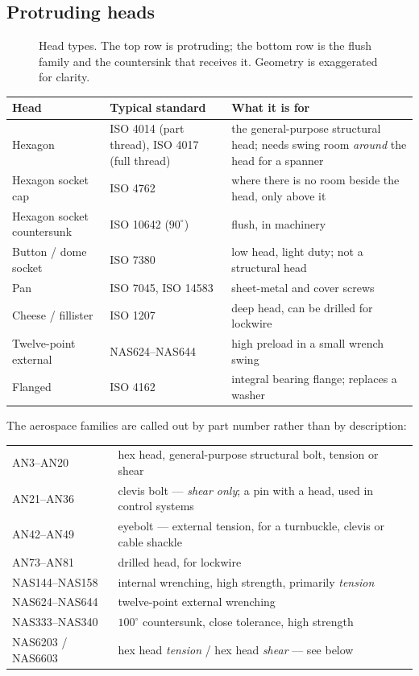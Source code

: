 \documentclass[11pt,a4paper]{article}
\begin{document}
\subsection{Protruding heads}

\begin{figure}[H]\centering
\resizebox{\textwidth}{!}{}
\caption{Head types. The top row is protruding; the bottom row is the flush family and the
countersink that receives it. Geometry is exaggerated for clarity.}
\label{fig:heads}
\end{figure}

\begin{center}\footnotesize
\begin{tabular}{@{}p{3.3cm}p{3.1cm}p{7.2cm}@{}}
\toprule
Head & Typical standard & What it is for\\
\midrule
Hexagon & ISO 4014 (part thread), ISO 4017 (full thread) & the general-purpose structural head; needs swing room \emph{around} the head for a spanner\\[2pt]
Hexagon socket cap & ISO 4762 & where there is no room beside the head, only above it\\[2pt]
Hexagon socket countersunk & ISO 10642 ($90^\circ$) & flush, in machinery\\[2pt]
Button / dome socket & ISO 7380 & low head, light duty; not a structural head\\[2pt]
Pan & ISO 7045, ISO 14583 & sheet-metal and cover screws\\[2pt]
Cheese / fillister & ISO 1207 & deep head, can be drilled for lockwire\\[2pt]
Twelve-point external & NAS624--NAS644 & high preload in a small wrench swing\\[2pt]
Flanged & ISO 4162 & integral bearing flange; replaces a washer\\
\bottomrule
\end{tabular}
\end{center}

\medskip
The aerospace families are called out by part number rather than by description:

\begin{center}\small
\begin{tabular}{@{}ll@{}}
\toprule
AN3--AN20 & hex head, general-purpose structural bolt, tension or shear\\
AN21--AN36 & clevis bolt --- \emph{shear only}; a pin with a head, used in control systems\\
AN42--AN49 & eyebolt --- external tension, for a turnbuckle, clevis or cable shackle\\
AN73--AN81 & drilled head, for lockwire\\
NAS144--NAS158 & internal wrenching, high strength, primarily \emph{tension}\\
NAS624--NAS644 & twelve-point external wrenching\\
NAS333--NAS340 & $100^\circ$ countersunk, close tolerance, high strength\\
NAS6203 / NAS6603 & hex head \emph{tension} / hex head \emph{shear} --- see below\\
\bottomrule
\end{tabular}
\end{center}
\end{document}
